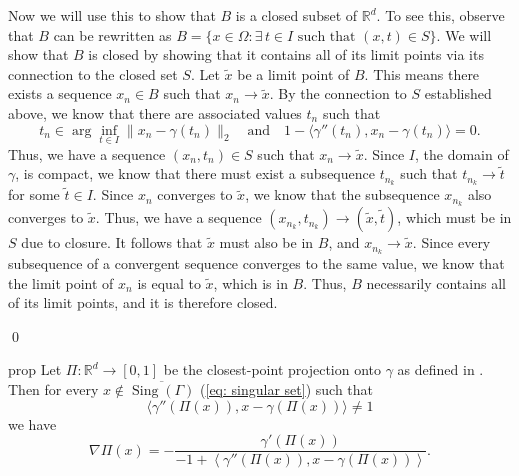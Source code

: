 \documentclass[11pt]{article}
\begin{document}
Now we will use this to show that $B$ is a closed subset of $\mathbb{R}^d$. To see this, observe that $B$ can be rewritten as $B = \{x \in \Omega: \exists \, t \in I \text{ such that }(x,t) \in S\}.$ We will show that $B$ is closed by showing that it contains all of its limit points via its connection to the closed set $S$. Let $\tilde{x}$ be a limit point of $B$. This means there exists a sequence $x_n \in B$ such that $x_n\rightarrow \tilde{x}$. By the connection to $S$ established above, we know that there are associated values $t_n$ such that 
\[t_n \in \arg\inf_{t \in I}\|x_n - \gamma(t_n)\|_2 \quad \text{and} \quad 1 - \langle\gamma''(t_n), x_n - \gamma(t_n)\rangle = 0.\]
Thus, we have a sequence $(x_n, t_n) \in S$ such that $x_n \rightarrow \tilde{x}$. Since $I$, the domain of $\gamma$, is compact, we know that there must exist a subsequence $t_{n_k}$ such that $t_{n_k}\rightarrow \tilde{t}$ for some $\tilde{t} \in I$. Since $x_n$ converges to $\tilde{x}$, we know that the subsequence $x_{n_k}$ also converges to $\tilde{x}$. Thus, we have a sequence $(x_{n_k}, t_{n_k}) \rightarrow (\tilde{x},\tilde{t})$, which must be in $S$ due to closure. It follows that $\tilde{x}$ must also be in $B$, and $x_{n_k} \rightarrow \tilde{x}$. Since every subsequence of a convergent sequence converges to the same value, we know that the limit point of $x_{n}$ is equal to $\tilde{x}$, which is in $B$. Thus, $B$ necessarily contains all of its limit points, and it is therefore closed.  

\qed{}



\begin{restatable}{prop}{} \label{prop: proj gradient}
    Let $\Pi: \mathbb{R}^d \rightarrow [0, 1]$ be the closest-point projection onto $\gamma$ as defined in . Then for every $x \notin \overline{\operatorname{Sing}(\Gamma)}$ (\cref{eq: singular set}) such that 
    \[\langle\gamma''(\Pi(x)), x - \gamma(\Pi(x))\rangle \neq 1\]
    we have 
    \[\nabla\Pi(x)  = -\frac{\gamma'(\Pi(x))}{-1 + \left\langle\gamma''(\Pi(x)), x - \gamma(\Pi(x))\right\rangle}.\]
\end{restatable}
\end{document}
